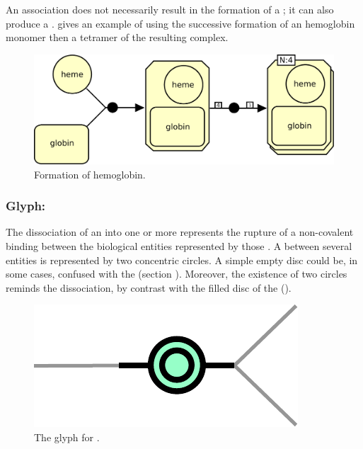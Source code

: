 An association does not necessarily result in the formation of a ; it can also produce a .  gives an example of using the successive formation of an hemoglobin monomer then a tetramer of the resulting complex.

\begin{figure}[H]
  \centering
  \includegraphics[scale = 0.5]{le_images/association-multimerisation}
  \caption{Formation of hemoglobin.}
  \label{fig:assoc-multi}
\end{figure}


\subsubsection{Glyph: }\label{sec:dissociation}

The dissociation of an  into one or more  represents the rupture of a non-covalent binding between the biological entities represented by those . A  between several entities is represented by two concentric circles. A simple empty disc could be, in some cases, confused with the  (section ). Moreover, the existence of two circles reminds the dissociation, by contrast with the filled disc of the  ().

\begin{figure}[H]
  \centering
  \includegraphics[scale = 0.5]{le_images/dissociation}
  \caption{The \PD glyph for .}
  \label{fig:dissociation}
\end{figure}

